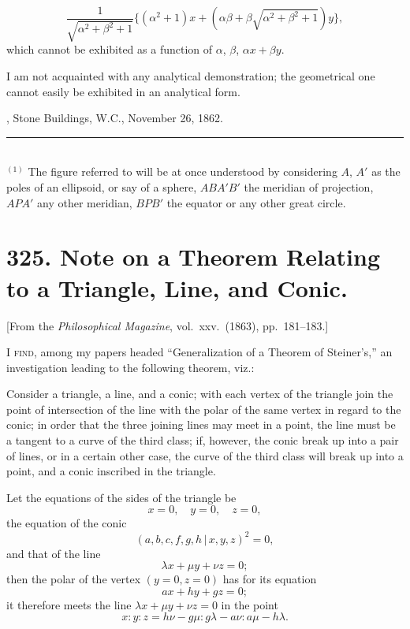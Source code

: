 \documentclass[11pt,a4paper]{article}
\theoremstyle{plain}
\begin{document}
\[
\frac{1}{\sqrt{\alpha^2 + \beta^2 + 1}}\{(\alpha^2 + 1)x + (\alpha\beta + \beta\sqrt{\alpha^2 + \beta^2 + 1})y\},
\]
which cannot be exhibited as a function of $\alpha$, $\beta$, $\alpha x + \beta y$.

I am not acquainted with any analytical demonstration; the geometrical one cannot easily be exhibited in an analytical form.

\medskip
{}, Stone Buildings, W.C., November 26, 1862.

\bigskip
\noindent\rule{0.3\textwidth}{0.4pt}\\
\footnotesize $^{(1)}$ The figure referred to will be at once understood by considering $A$, $A'$ as the poles of an ellipsoid, or say of a sphere, $ABA'B'$ the meridian of projection, $APA'$ any other meridian, $BPB'$ the equator or any other great circle.


\newpage
\section*{325. Note on a Theorem Relating to a Triangle, Line, and Conic.}

[From the \textit{Philosophical Magazine}, vol.\ xxv.\ (1863), pp.\ 181--183.]

\medskip

I \textsc{find}, among my papers headed ``Generalization of a Theorem of Steiner's,'' an investigation leading to the following theorem, viz.:

Consider a triangle, a line, and a conic; with each vertex of the triangle join the point of intersection of the line with the polar of the same vertex in regard to the conic; in order that the three joining lines may meet in a point, the line must be a tangent to a curve of the third class; if, however, the conic break up into a pair of lines, or in a certain other case, the curve of the third class will break up into a point, and a conic inscribed in the triangle.

Let the equations of the sides of the triangle be
\[
x = 0, \quad y = 0, \quad z = 0,
\]
the equation of the conic
\[
(a, b, c, f, g, h \,\vert\, x, y, z)^2 = 0,
\]
and that of the line
\[
\lambda x + \mu y + \nu z = 0;
\]
then the polar of the vertex $(y = 0, z = 0)$ has for its equation
\[
ax + hy + gz = 0;
\]
it therefore meets the line $\lambda x + \mu y + \nu z = 0$ in the point
\[
x : y : z = h\nu - g\mu : g\lambda - a\nu : a\mu - h\lambda.
\]

\noindent[Continues on p.~101.]
\end{document}

